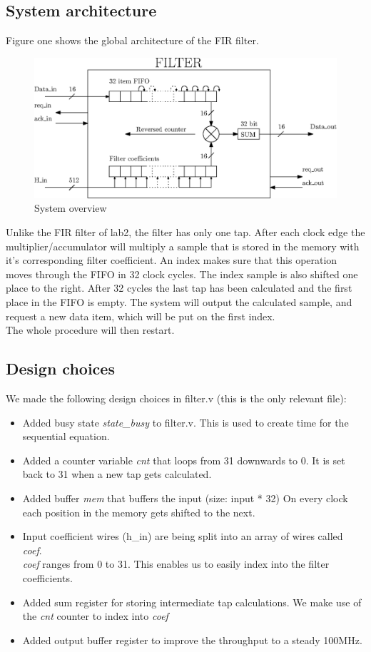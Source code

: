 \documentclass[a4paper,twoside,11pt, fleqn]{article}
\begin{document}
\subsection{System architecture}
Figure one shows the global architecture of the FIR filter. 
\begin{figure}[h]
	\includegraphics[scale = 1]{Images/3a_blockdiagram}
    \caption{System overview}
\end{figure}

Unlike the FIR filter of lab2, the filter has only one tap. After each clock edge the multiplier/accumulator will multiply a sample that is stored in the memory with it's corresponding filter coefficient. An index makes sure that this operation moves through the FIFO in 32 clock cycles. The index sample is also shifted one place to the right. After 32 cycles the last tap has  been calculated and the first place in the FIFO is empty. The system will output the calculated sample, and request a new data item, which will be put on the first index.\\ 

The whole procedure will then restart.
\subsection{Design choices}
We made the following design choices in filter.v (this is the only relevant file):
\begin{itemize}
	\item Added busy state \textit{state\_busy} to filter.v.
		\subitem This is used to create time for the sequential equation. 
	\item Added a counter variable \textit{cnt} that loops from 31 downwards to 0. It is set back to 31 when a new tap gets calculated.
	\item Added buffer \textit{mem} that buffers the input (size: input * 32)
		\subitem On every clock each position in the memory gets shifted to the next.
	\item Input coefficient wires (h\_in) are being split into an array of wires called \textit{coef}. \\ \textit{coef} ranges from 0 to 31.
		\subitem This enables us to easily index into the filter coefficients.
	\item Added sum register for storing intermediate tap calculations.
		\subitem We make use of the \textit{cnt} counter to index into \textit{coef}
	\item Added output buffer register to improve the throughput to a steady 100MHz.

\end{itemize}
\end{document}
